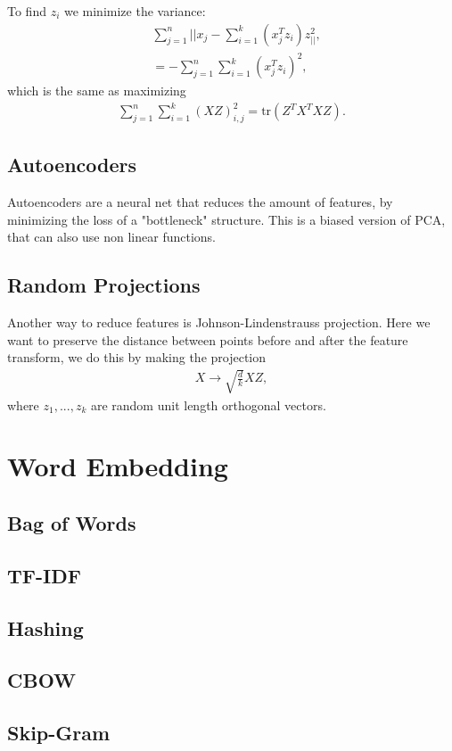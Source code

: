 \documentclass[a4paper,oneside,article]{memoir}
\begin{document}
To find $z_i$ we minimize the variance: 
\begin{align*}
    &\sum_{j=1}^{n}||x_j-\sum_{i=1}^{k}(x_j^Tz_i)z_||^2, \\
    &= -\sum_{j=1}^{n}\sum_{i=1}^{k}(x_j^Tz_i)^2,
\end{align*}
which is the same as maximizing 
\begin{align*}
    \sum_{j=1}^{n}\sum_{i=1}^{k}(XZ)_{i,j}^2 = \text{tr}(Z^TX^TXZ).
\end{align*}

\section{Autoencoders}
Autoencoders are a neural net that reduces the amount of features, by minimizing the loss of a "bottleneck" structure. 
This is a biased version of PCA, that can also use non linear functions. 

\section{Random Projections}
Another way to reduce features is Johnson-Lindenstrauss projection. 
Here we want to preserve the distance between points before and after the feature transform, we do this by making the projection
\begin{align*}
    X \rightarrow \sqrt{\frac{d}{k}}XZ,
\end{align*}
where $z_1,...,z_k$ are random unit length orthogonal vectors. 

\chapter{Word Embedding}
\section{Bag of Words}

\section{TF-IDF}

\section{Hashing}

\section{CBOW}

\section{Skip-Gram}
\end{document}
